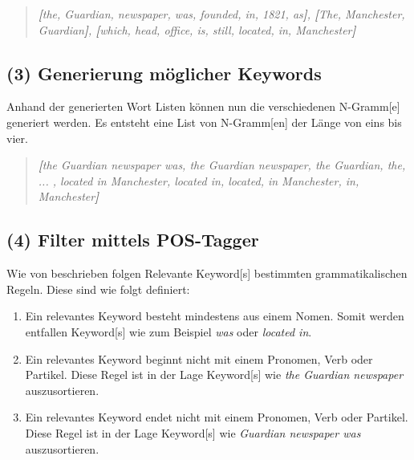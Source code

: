\begin{quote}
\textit{\textbf{[}the, Guardian, newspaper, was, founded, in, 1821, as\textbf{]}, \textbf{[}The, Manchester, Guardian\textbf{]}, \textbf{[}which, head, office, is, still, located, in, Manchester\textbf{]}}
\end{quote}



\subsection{(3) Generierung möglicher Keywords}


Anhand der generierten Wort Listen können nun die verschiedenen \gls{N-Gramm}[e] generiert werden. Es entsteht eine List von \gls{N-Gramm}[en] der Länge von eins bis vier.

\begin{quote}
\textit{\textbf{[}the Guardian newspaper was, the Guardian newspaper, the Guardian, the, ... , located in Manchester, located in, located, in Manchester, in, Manchester\textbf{]}}
\end{quote}



\subsection{(4) Filter mittels POS-Tagger}


Wie von \cite{parameswaran2010towards} beschrieben folgen Relevante \gls{Keyword}[s] bestimmten grammatikalischen Regeln. Diese sind wie folgt definiert:
\begin{enumerate}
    \item Ein relevantes \gls{Keyword} besteht mindestens aus einem Nomen. Somit werden entfallen \gls{Keyword}[s] wie zum Beispiel \textit{was} oder \textit{located in}.
    \item Ein relevantes \gls{Keyword} beginnt nicht mit einem Pronomen, Verb oder Partikel. Diese Regel ist in der Lage \gls{Keyword}[s] wie \textit{the Guardian newspaper} auszusortieren.
    \item Ein relevantes \gls{Keyword} endet nicht mit einem Pronomen, Verb oder Partikel. Diese Regel ist in der Lage \gls{Keyword}[s] wie \textit{Guardian newspaper was} auszusortieren.
\end{enumerate}

